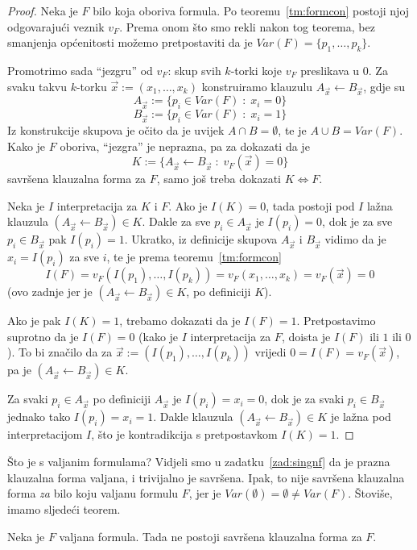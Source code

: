 \begin{proof}
Neka je $F$ bilo koja oboriva formula. Po teoremu~\ref{tm:formcon} postoji njoj odgovarajući veznik $v_F$. Prema onom što smo rekli nakon tog teorema, bez smanjenja općenitosti možemo pretpostaviti da je $Var(F)=\{p_1,\ldots,p_k\}$.

Promotrimo sada ``jezgru'' od $v_F$: skup svih $k$-torki koje $v_F$ preslikava u $0$. Za svaku takvu $k$-torku $\vec x:=(x_1,\ldots,x_k)$ konstruiramo klauzulu $A_{\vec x}\leftarrow B_{\vec x}$, gdje su
$$A_{\vec x}:=\{p_i\in Var(F)\;:\;x_i=0\}$$
$$B_{\vec x}:=\{p_i\in Var(F)\;:\;x_i=1\}$$
Iz konstrukcije skupova je očito da je uvijek $A\cap B=\emptyset$, te je $A\cup B=Var(F)$. Kako je $F$ oboriva, ``jezgra'' je neprazna, pa za dokazati da je
$$K:=\{A_{\vec x}\leftarrow B_{\vec x}\;:\;v_F(\vec x)=0\}$$
savršena klauzalna forma za $F$, samo još treba dokazati $K\Leftrightarrow F$.

Neka je $I$ interpretacija za $K$ i $F$. Ako je $I(K)=0$, tada postoji pod $I$ lažna klauzula $(A_{\vec x}\leftarrow B_{\vec x})\in K$. Dakle za sve $p_i\in A_{\vec x}$ je $I(p_i)=0$, dok je za sve $p_i\in B_{\vec x}$ pak $I(p_i)=1$. Ukratko, iz definicije skupova $A_{\vec x}$ i $B_{\vec x}$ vidimo da je $x_i=I(p_i)$ za sve $i$, te je prema teoremu~\ref{tm:formcon}
$$I(F)=v_F(I(p_1),\ldots,I(p_k))=v_F(x_1,\ldots,x_k)=v_F(\vec x)=0$$
(ovo zadnje jer je $(A_{\vec x}\leftarrow B_{\vec x})\in K$, po definiciji $K$).

Ako je pak $I(K)=1$, trebamo dokazati da je $I(F)=1$. Pretpostavimo suprotno da je $I(F)=0$ (kako je $I$ interpretacija za $F$, doista je $I(F)$ ili $1$ ili $0$). To bi značilo da za $\vec x:=(I(p_1),\ldots,I(p_k))$ vrijedi $0=I(F)=v_F(\vec x)$, pa je $(A_{\vec x}\leftarrow B_{\vec x})\in K$.

Za svaki $p_i\in A_{\vec x}$ po definiciji $A_{\vec x}$ je $I(p_i)=x_i=0$, dok je za svaki $p_i\in B_{\vec x}$ jednako tako $I(p_i)=x_i=1$. Dakle klauzula $(A_{\vec x}\leftarrow B_{\vec x})\in K$ je lažna pod interpretacijom $I$, što je kontradikcija s pretpostavkom $I(K)=1$.
\end{proof}

Što je s valjanim formulama? Vidjeli smo u zadatku~\ref{zad:singnf} da je prazna klauzalna forma valjana, i trivijalno je savršena. Ipak, to nije savršena klauzalna forma \emph{za} bilo koju valjanu formulu $F$, jer je $Var(\emptyset)=\emptyset\not=Var(F)$. Štoviše, imamo sljedeći teorem.

\begin{teorem}
Neka je $F$ valjana formula. Tada ne postoji savršena klauzalna forma za $F$.
\end{teorem}

